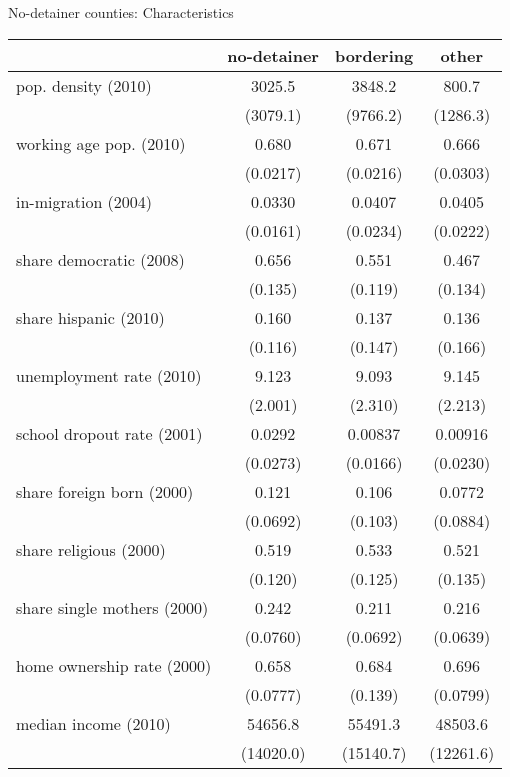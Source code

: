 \documentclass[xcolor=pdftex,dvipsnames,table,handout]{beamer}
\begin{document}
\begin{frame}{No-detainer counties: Characteristics}
\scriptsize
\begin{center}
\begin{tabular}{lccc}\hline
                    						&    no-detainer	&     bordering	&       other \\
\hline
pop. density (2010) 					&      3025.5	&      3848.2	&       800.7	\\
                    						&    (3079.1)	&    (9766.2)	&    (1286.3)	\\
working age pop. (2010)				&       0.680	&       0.671	&       0.666	\\
                    						&    (0.0217)	&    (0.0216)	&    (0.0303)	\\
in-migration (2004) 					&      0.0330	&      0.0407	&      0.0405	\\
                    						&    (0.0161)	&    (0.0234)	&    (0.0222)	\\
share democratic (2008)				&       0.656	&       0.551	&       0.467	\\
                    						&     (0.135)	&     (0.119)	&     (0.134)	\\
share hispanic (2010)				&       0.160	&       0.137	&       0.136	\\
                    						&     (0.116)	&     (0.147)	&     (0.166)	\\
unemployment rate (2010)			&       9.123	&       9.093	&       9.145	\\
                    						&     (2.001)	&     (2.310)	&     (2.213)	\\
school dropout rate (2001)			&      0.0292	&     0.00837	&     0.00916	\\
                    						&    (0.0273)	&    (0.0166)	&    (0.0230)	\\
share foreign born (2000)				&       0.121	&       0.106	&      0.0772	\\	
                    						&    (0.0692)	&     (0.103)	&    (0.0884)	\\
share religious (2000)				&       0.519	&       0.533	&       0.521	\\
                    						&     (0.120)	&     (0.125)	&     (0.135)	\\
share single mothers (2000)			&       0.242	&       0.211	&       0.216	\\
                   						&    (0.0760)	&    (0.0692)	&    (0.0639)	\\
home ownership rate (2000)			&       0.658	&       0.684	&       0.696	\\
                    						&    (0.0777)	&     (0.139)	&    (0.0799)	\\
median income (2010)				&     54656.8	&     55491.3	&     48503.6	\\
                    						&   (14020.0)	&   (15140.7)	&   (12261.6)	\\\hline
\end{tabular}
\end{center}
\end{frame}
\end{document}
